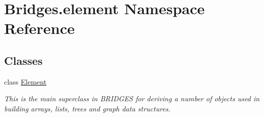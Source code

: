 \hypertarget{namespace_bridges_1_1element}{}\section{Bridges.\+element Namespace Reference}
\label{namespace_bridges_1_1element}
\subsection*{Classes}
\begin{DoxyCompactItemize}
\item 
class \hyperlink{class_bridges_1_1element_1_1_element}{Element}
\begin{DoxyCompactList}\small\item\em This is the main superclass in B\+R\+I\+D\+G\+E\+S for deriving a number of objects used in building arrays, lists, trees and graph data structures. \end{DoxyCompactList}\end{DoxyCompactItemize}
